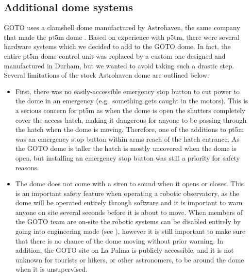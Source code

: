 \begin{colsection}
\begin{colsection}
\end{colsection}


\newpage
\subsection{Additional dome systems}
\label{sec:arduino}
\begin{colsection}

GOTO uses a clamshell dome manufactured by Astrohaven, the same company that made the pt5m dome \citep{pt5m}. Based on experience with p5tm, there were several hardware systems which we decided to add to the GOTO dome. In fact, the entire pt5m dome control unit was replaced by a custom one designed and manufactured in Durham, but we wanted to avoid taking such a drastic step. Several limitations of the stock Astrohaven dome are outlined below.
%
\begin{itemize}
    \item First, there was no easily-accessible emergency stop button to cut power to the dome in an emergency (e.g.\ something gets caught in the motors). This is a serious concern for pt5m as when the dome is open the shutters completely cover the access hatch, making it dangerous for anyone to be passing through the hatch when the dome is moving. Therefore, one of the additions to pt5m was an emergency stop button within arms reach of the hatch entrance. As the GOTO dome is taller the hatch is mostly uncovered when the dome is open, but installing an emergency stop button was still a priority for safety reasons.
    \item The dome does not come with a siren to sound when it opens or closes. This is an important safety feature when operating a robotic observatory, as the dome will be operated entirely through software and it is important to warn anyone on site several seconds before it is about to move. When members of the GOTO team are on-site the robotic systems can be disabled entirely by going into engineering mode (see ), however it is still important to make sure that there is no chance of the dome moving without prior warning. In addition, the GOTO site on La Palma is publicly accessible, and it is not unknown for tourists or hikers, or other astronomers, to be around the dome when it is unsupervised.

\end{itemize}
\end{colsection}
\end{colsection}
